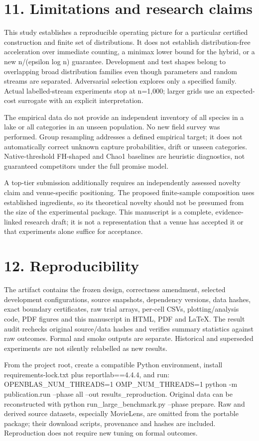 \documentclass[10pt]{article}
\begin{document}
\section*{11. Limitations and research claims}
This study establishes a reproducible operating picture for a particular certified construction and finite set of distributions. It does not establish distribution-free acceleration over immediate counting, a minimax lower bound for the hybrid, or a new n/(epsilon log n) guarantee. Development and test shapes belong to overlapping broad distribution families even though parameters and random streams are separated. Adversarial selection explores only a specified family. Actual labelled-stream experiments stop at n=1,000; larger grids use an expected-cost surrogate with an explicit interpretation.

The empirical data do not provide an independent inventory of all species in a lake or all categories in an unseen population. No new field survey was performed. Group resampling addresses a defined empirical target; it does not automatically correct unknown capture probabilities, drift or unseen categories. Native-threshold FH-shaped and Chao1 baselines are heuristic diagnostics, not guaranteed competitors under the full promise model.

A top-tier submission additionally requires an independently assessed novelty claim and venue-specific positioning. The proposed finite-sample composition uses established ingredients, so its theoretical novelty should not be presumed from the size of the experimental package. This manuscript is a complete, evidence-linked research draft; it is not a representation that a venue has accepted it or that experiments alone suffice for acceptance.

\section*{12. Reproducibility}
The artifact contains the frozen design, correctness amendment, selected development configurations, source snapshots, dependency versions, data hashes, exact boundary certificates, raw trial arrays, per-cell CSVs, plotting/analysis code, PDF figures and this manuscript in HTML, PDF and LaTeX. The result audit rechecks original source/data hashes and verifies summary statistics against raw outcomes. Formal and smoke outputs are separate. Historical and superseded experiments are not silently relabelled as new results.

From the project root, create a compatible Python environment, install requirements-lock.txt plus reportlab==4.4.4, and run: OPENBLAS\_NUM\_THREADS=1 OMP\_NUM\_THREADS=1 python -m publication.run --phase all --out results\_reproduction. Original data can be reconstructed with python run\_large\_benchmark.py --phase prepare. Raw and derived source datasets, especially MovieLens, are omitted from the portable package; their download scripts, provenance and hashes are included. Reproduction does not require new tuning on formal outcomes.
\end{document}
